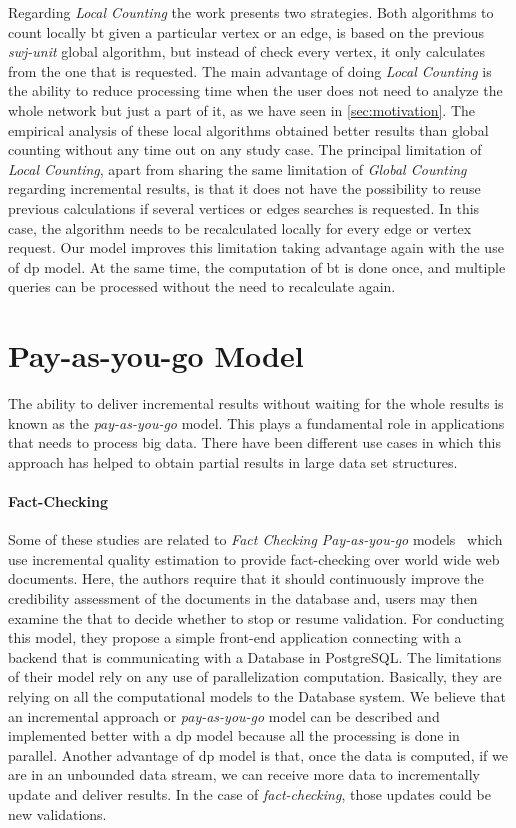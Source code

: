 Regarding \emph{Local Counting} the work presents two strategies. 
Both algorithms to count locally \acrshort{bt} given a particular vertex or an edge, is based on the previous \emph{swj-unit} global algorithm, but instead of check every vertex, it only calculates from the one that is requested. 
The main advantage of doing \emph{Local Counting} is the ability to reduce processing time when the user does not need to analyze the whole network but just a part of it, as we have seen in \autoref{sec:motivation}.
The empirical analysis of these local algorithms obtained better results than global counting without any time out on any study case.
The principal limitation of \emph{Local Counting}, apart from sharing the same limitation of \emph{Global Counting} regarding incremental results, is that it does not have the possibility to reuse previous calculations if several vertices or edges searches is requested. 
In this case, the algorithm needs to be recalculated locally for every edge or vertex request.
Our model improves this limitation taking advantage again with the use of \acrshort{dp} model. At the same time, the computation of \acrshort{bt} is done once, and multiple queries can be processed without the need to recalculate again.

\section{Pay-as-you-go Model}
The ability to deliver incremental results without waiting for the whole results is known as the \emph{pay-as-you-go} model. This plays a fundamental role in applications that needs to process big data. 
There have been different use cases in which this approach has helped to obtain partial results in large data set structures.

\paragraph{Fact-Checking} Some of these studies are related to \emph{Fact Checking Pay-as-you-go} models~\cite{factcatch} which use incremental quality estimation to provide fact-checking over world wide web documents.
Here, the authors require that it should continuously improve the credibility assessment of the documents in the database and, users may then examine the
that to decide whether to stop or resume validation.
For conducting this model, they propose a simple front-end application connecting with a backend that is communicating with a Database in PostgreSQL. 
The limitations of their model rely on any use of parallelization computation. Basically, they are relying on all the computational models to the Database system. 
We believe that an incremental approach or \emph{pay-as-you-go} model can be described and implemented better with a \acrshort{dp} model because all the processing is done in parallel. 
Another advantage of \acrshort{dp} model is that, once the data is computed, if we are in an unbounded data stream, we can receive more data to incrementally update and deliver results. 
In the case of \emph{fact-checking}, those updates could be new validations.

